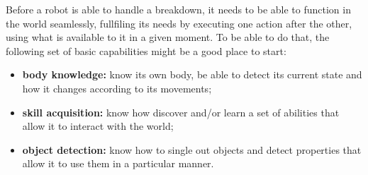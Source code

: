 \documentclass{article}
\begin{document}

Before a robot is able to handle a breakdown, it needs to be able to function in
the world seamlessly, fullfiling its needs by executing one action after the
other, using what is available to it in a given moment. To be able to do that,
the following set of basic capabilities might be a good place to start:

\begin{itemize}
\item \textbf{body knowledge:} know its own body, be able to detect its current
state and how it changes according to its movements;
\item \textbf{skill acquisition:} know how discover and/or learn a set of
abilities that allow it to interact with the world;
\item \textbf{object detection:} know how to single out objects and detect
properties that allow it to use them in a particular manner.
\end{itemize}



\end{document}
